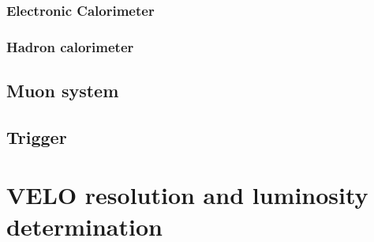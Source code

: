 \subsubsection{Electronic Calorimeter}
\subsubsection{Hadron calorimeter}
\subsection{Muon system}
\subsection{Trigger}
\subsubsection{\lone}
\subsubsection{\hltone}
\subsubsection{\hlttwo}


\section{VELO resolution and luminosity determination}